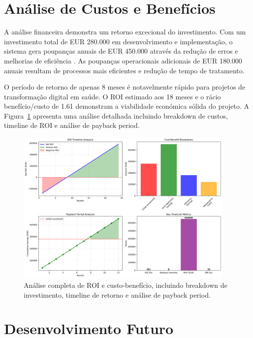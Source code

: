 \section{Análise de Custos e Benefícios}

A análise financeira demonstra um retorno excecional do investimento. Com um investimento total de EUR 280.000 em desenvolvimento e implementação, o sistema gera poupanças anuais de EUR 450.000 através da redução de erros e melhorias de eficiência \cite{rozenblum2020}. As poupanças operacionais adicionais de EUR 180.000 anuais resultam de processos mais eficientes e redução de tempo de tratamento.

O período de retorno de apenas 8 meses é notavelmente rápido para projetos de transformação digital em saúde. O ROI estimado aos 18 meses \cite{adler2021} e o rácio benefício/custo de 1.61 demonstram a viabilidade económica sólida do projeto. A Figura~\ref{fig:roi-analysis} apresenta uma análise detalhada incluindo breakdown de custos, timeline de ROI e análise de payback period.

\begin{figure}[htbp]
    \centering
    \includegraphics[width=0.95\textwidth]{images/generated/roi_analysis.png}
    \caption{Análise completa de ROI e custo-benefício, incluindo breakdown de investimento, timeline de retorno e análise de payback period.}
    \label{fig:roi-analysis}
\end{figure}

\section{Desenvolvimento Futuro}

